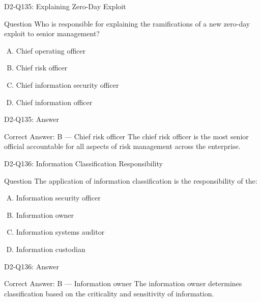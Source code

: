 \documentclass{beamer}
\begin{document}
	\begin{frame}{D2-Q135: Explaining Zero-Day Exploit}
		\begin{block}{Question}
			Who is responsible for explaining the ramifications of a new zero-day exploit to senior management?
		\end{block}
		\begin{enumerate}[(A)]
			\item Chief operating officer
			\item Chief risk officer
			\item Chief information security officer
			\item Chief information officer
		\end{enumerate}
	\end{frame}
	\begin{frame}{D2-Q135: Answer}
		\begin{block}{Correct Answer: B --- Chief risk officer}
			The chief risk officer is the most senior official accountable for all aspects of risk management across the enterprise.
		\end{block}
	\end{frame}
	
	\begin{frame}{D2-Q136: Information Classification Responsibility}
		\begin{block}{Question}
			The application of information classification is the responsibility of the:
		\end{block}
		\begin{enumerate}[(A)]
			\item Information security officer
			\item Information owner
			\item Information systems auditor
			\item Information custodian
		\end{enumerate}
	\end{frame}
	\begin{frame}{D2-Q136: Answer}
		\begin{block}{Correct Answer: B --- Information owner}
			The information owner determines classification based on the criticality and sensitivity of information.
		\end{block}
	\end{frame}
	
\end{document}

